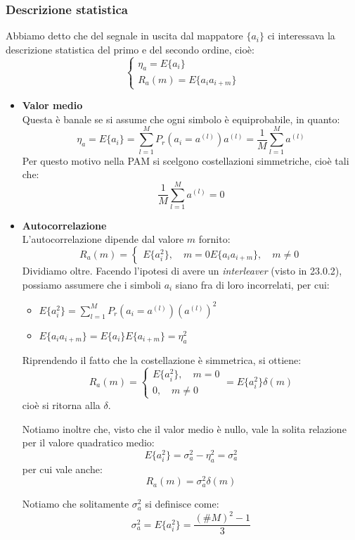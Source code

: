 \documentclass[a4paper,11pt]{article}
\begin{document}
\subsubsection{Descrizione statistica}
Abbiamo detto che del segnale in uscita dal mappatore $\{a_i\}$ ci interessava la descrizione statistica del primo e del secondo ordine, cioè:
$$
\begin{cases}
	\eta_a = E \{a_i\} \\
	R_a (m) = E \{ a_i a_{i + m} \}
\end{cases}
$$
\begin{itemize}
\item \textbf{\textsf{Valor medio}} \\
Questa è banale se si assume che ogni simbolo è equiprobabile, in quanto:
$$
\eta_a = E \{a_i\} = \sum_{l = 1}^M P_r(a_i = a^{(l)}) a^{(l)} = \frac{1}{M} \sum_{l = 1}^M a^{(l)}
$$
Per questo motivo nella PAM si scelgono costellazioni simmetriche, cioè tali che:
$$
\frac{1}{M} \sum_{l = 1}^M a^{(l)} = 0
$$
\item \textbf{\textsf{Autocorrelazione}} \\
L'autocorrelazione dipende dal valore $m$ fornito:
$$
R_a(m) =
\begin{cases}
	E \{a_i^2\}, \quad m = 0
	E \{a_i a_{i + m}\}, \quad m \neq 0
\end{cases}
$$
Dividiamo oltre. Facendo l'ipotesi di avere un \textit{interleaver} (visto in 23.0.2), possiamo assumere che i simboli $a_i$ siano fra di loro incorrelati, per cui:
\begin{itemize}
	\item 
$
E\{ a_i^2 \} = \sum_{l = 1}^M P_r \left(a_i = a^{(l)}\right) \left(a^{(l)}\right)^2
$
\item
$
E\{ a_i a_{i + m} \} = E\{a_i\}E\{a_{i + m}\} = \eta_a^2
$
\end{itemize}

Riprendendo il fatto che la costellazione è simmetrica, si ottiene:
$$
R_a(m) =
\begin{cases}
	E\{a_i^2\}, \quad m = 0 \\
	0, \quad m \neq 0
\end{cases}
= E \{ a_i^2 \} \delta(m)
$$
cioè si ritorna alla $\delta$.

Notiamo inoltre che, visto che il valor medio è nullo, vale la solita relazione per il valore quadratico medio:
$$
E\{a_i^2\} = \sigma^2_a - \eta_a^2 = \sigma^2_a 
$$
per cui vale anche:
$$
R_a(m) = \sigma^2_a \delta(m)
$$

Notiamo che solitamente $\sigma_a^2$ si definisce come:
$$
\sigma_a^2 = E \{ a_i^2 \} = \frac{(\# M)^2 - 1}{3}
$$

\end{itemize}
\end{document}
